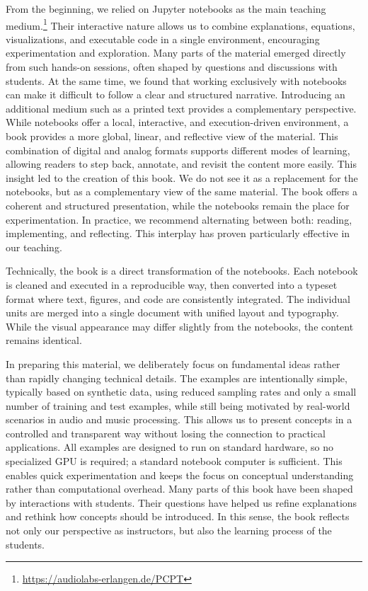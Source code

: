 {From the beginning, we relied on Jupyter notebooks as the main teaching medium.\footnote{\url{https://audiolabs-erlangen.de/PCPT}} Their interactive nature allows us to combine explanations, equations, visualizations, and executable code in a single environment, encouraging experimentation and exploration. Many parts of the material emerged directly from such hands-on sessions, often shaped by questions and discussions with students. At the same time, we found that working exclusively with notebooks can make it difficult to follow a clear and structured narrative. Introducing an additional medium such as a printed text provides a complementary perspective. While notebooks offer a local, interactive, and execution-driven environment, a book provides a more global, linear, and reflective view of the material. This combination of digital and analog formats supports different modes of learning, allowing readers to step back, annotate, and revisit the content more easily. This insight led to the creation of this book. We do not see it as a replacement for the notebooks, but as a \mbox{complementary} view of the same material. The book offers a coherent and structured presentation, while the notebooks remain the place for experimentation. In practice, we recommend alternating between both: reading, implementing, and reflecting. This interplay has proven particularly effective in our teaching.

Technically, the book is a  direct transformation of the notebooks. Each notebook is cleaned and executed in a reproducible way, then converted into a typeset format where text, figures, and code are consistently integrated. The individual units are merged into a single document with unified layout and typography. While the visual appearance may differ slightly from the notebooks, the content remains identical.

In preparing this material, we deliberately focus on fundamental ideas rather than rapidly changing technical details. The examples are intentionally simple, typically based on synthetic data, using reduced sampling rates and only a small number of training and test examples, while still being motivated by real-world scenarios in audio and music processing. This allows us to present concepts in a controlled and transparent way without losing the connection to practical applications. All examples are designed to run on standard hardware, so no specialized GPU is required; a standard notebook computer is sufficient. This enables quick experimentation and keeps the focus on conceptual understanding rather than computational overhead. Many parts of this book have been shaped by interactions with students. Their questions have helped us refine explanations and rethink how concepts should be introduced. In this sense, the book reflects not only our perspective as instructors, but also the learning process of the students.

}
